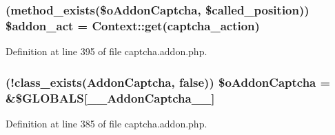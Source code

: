 \subsubsection[{\texorpdfstring{\$addon\+\_\+act}{$addon_act}}]{ (method\+\_\+exists(\$o\+Addon\+Captcha, \$called\+\_\+position)) \$addon\+\_\+act = {\bf Context\+::get}(\textquotesingle{}captcha\+\_\+action\textquotesingle{})}\hypertarget{captcha_8addon_8php_a75413f1382fb293fee30843cf3834785}{}\label{captcha_8addon_8php_a75413f1382fb293fee30843cf3834785}


Definition at line 395 of file captcha.\+addon.\+php.

\subsubsection[{\texorpdfstring{\$o\+Addon\+Captcha}{$oAddonCaptcha}}]{ (!class\+\_\+exists(\textquotesingle{}Addon\+Captcha\textquotesingle{}, false)) \$o\+Addon\+Captcha = \&\$G\+L\+O\+B\+A\+LS\mbox{[}\textquotesingle{}\+\_\+\+\_\+\+Addon\+Captcha\+\_\+\+\_\+\textquotesingle{}\mbox{]}}\hypertarget{captcha_8addon_8php_ab9ab3bb5657fc72fca17e44743d1d20a}{}\label{captcha_8addon_8php_ab9ab3bb5657fc72fca17e44743d1d20a}


Definition at line 385 of file captcha.\+addon.\+php.

